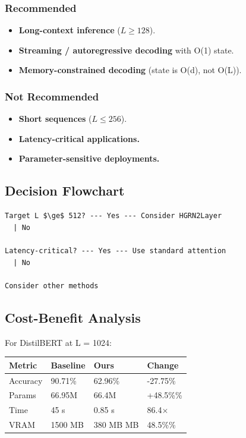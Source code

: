 \subsubsection{Recommended}
\begin{itemize}
\item \textbf{Long-context inference} ($L \geq 128$).
\item \textbf{Streaming / autoregressive decoding} with O(1) state.
\item \textbf{Memory-constrained decoding} (state is O(d), not O(L)).

\end{itemize}
\subsubsection{Not Recommended}
\begin{itemize}
\item \textbf{Short sequences} ($L \leq 256$).
\item \textbf{Latency-critical applications.}
\item \textbf{Parameter-sensitive deployments.}

\end{itemize}
\subsection{Decision Flowchart}

\begin{lstlisting}
Target L $\ge$ 512? --- Yes --- Consider HGRN2Layer
  | No
   
Latency-critical? --- Yes --- Use standard attention
  | No
   
Consider other methods
\end{lstlisting}

\subsection{Cost-Benefit Analysis}

For DistilBERT at L = 1024:

\begin{table}[H]
\centering
\small
\begin{tabular}{llll}
\toprule
\textbf{Metric} & \textbf{Baseline} & \textbf{Ours} & \textbf{Change} \\
\midrule
Accuracy & 90.71\% & 62.96\% & -27.75\% \\
Params & 66.95M & 66.4M & +48.5\%\% \\
Time & 45 s & 0.85 s & 86.4$\times$ \\
VRAM & 1500 MB & 380 MB MB & 48.5\%\% \\
\bottomrule
\end{tabular}
\end{table}

